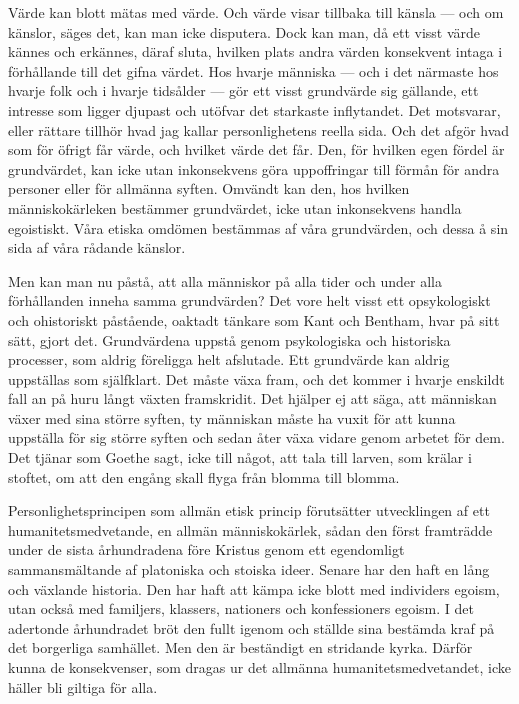 \documentclass[12pt]{article}
\newcommand{\opage}[1]{\marginnote{\footnotesize\textit{[#1]}}}
\begin{document}
Värde kan blott mätas med värde. Och värde visar tillbaka till känsla --- och om känslor, säges det, kan man icke disputera. Dock kan man, då ett visst värde kännes och erkännes, däraf sluta, hvilken plats andra värden konsekvent intaga i förhållande till det gifna värdet. Hos hvarje människa --- och i det närmaste hos hvarje folk och i hvarje tidsålder --- gör ett visst grundvärde sig gällande, ett intresse som ligger djupast och utöfvar det starkaste inflytandet. Det motsvarar, eller rättare tillhör hvad jag kallar personlighetens reella sida. Och det afgör hvad som för öfrigt får värde, och hvilket värde det får. Den, för hvilken egen fördel är grundvärdet, %
\opage{52}
kan icke utan inkonsekvens göra uppoffringar till förmån för andra personer eller för allmänna syften. Omvändt kan den, hos hvilken människokärleken bestämmer grundvärdet, icke utan inkonsekvens handla egoistiskt. Våra etiska omdömen bestämmas af våra grundvärden, och dessa å sin sida af våra rådande känslor.

Men kan man nu påstå, att alla människor på alla tider och under alla förhållanden inneha samma grundvärden? Det vore helt visst ett opsykologiskt och ohistoriskt påstående, oaktadt tänkare som Kant och Bentham, hvar på sitt sätt, gjort det. Grundvärdena uppstå genom psykologiska och historiska processer, som aldrig föreligga helt afslutade. Ett grundvärde kan aldrig uppställas som själfklart. Det måste växa fram, och det kommer i hvarje enskildt fall an på huru långt växten framskridit. Det hjälper ej att säga, att människan växer med sina större syften, ty människan måste ha vuxit för att kunna uppställa för sig större syften och sedan åter växa vidare genom arbetet för dem. Det tjänar som Goethe sagt, icke till något, att tala till larven, som krälar i stoftet, om att den %
\opage{53}
engång skall flyga från blomma  till blomma.

Personlighetsprincipen som allmän etisk princip förutsätter utvecklingen af ett humanitetsmedvetande, en allmän människokärlek, sådan den först framträdde under de sista århundradena före Kristus genom ett egendomligt sammansmältande af platoniska och stoiska ideer. Senare har den haft en lång och växlande historia. Den har haft att kämpa icke blott med individers egoism, utan också med familjers, klassers, nationers och konfessioners egoism. I det adertonde århundradet bröt den fullt igenom och ställde sina bestämda kraf på det borgerliga samhället. Men den är beständigt en stridande kyrka. Därför kunna de konsekvenser, som dragas ur det allmänna humanitetsmedvetandet, icke häller bli giltiga för alla. 
\end{document}

